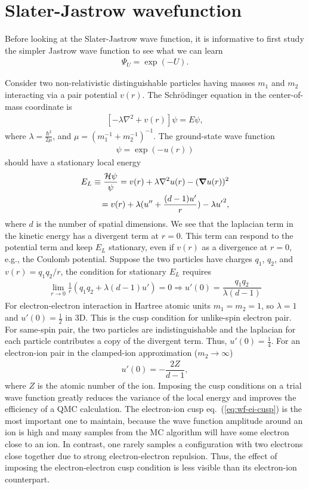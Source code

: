\chapter{Slater-Jastrow wavefunction}

Before looking at the Slater-Jastrow wave function, it is informative to first study the simpler Jastrow wave function to see what we can learn
\begin{align}
\Psi_U = \exp(-U).
\end{align}

Consider two non-relativistic distinguishable particles having masses $m_1$ and $m_2$ interacting via a pair potential $v(r)$. The Schr\"odinger equation in the center-of-mass coordinate is
\begin{align}
\left[-\lambda\nabla^2 + v(r)\right] \psi = E\psi,
\end{align}
where $\lambda=\frac{\hbar^2}{2\mu}$, and $\mu=(m_1^{-1}+m_2^{-1})^{-1}$. The ground-state wave function
\begin{align}
\psi = \exp(-u(r))
\end{align}
should have a stationary local energy
\begin{align} \label{eq:wf-cusp}
E_L \equiv \dfrac{\mathcal{H}\psi}{\psi} = v(r) + \lambda\nabla^2u(r) - (\boldsymbol{\nabla}u(r))^2 \nonumber \\
= v(r) + \lambda (u''+\frac{(d-1)u'}{r}) - \lambda {u'}^2,
\end{align}
where $d$ is the number of spatial dimensions.
We see that the laplacian term in the kinetic energy has a divergent term at $r=0$.
This term can respond to the potential term and keep $E_L$ stationary, even if $v(r)$ as a divergence at $r=0$, e.g., the Coulomb potential. Suppose the two particles have charges $q_1$, $q_2$, and $v(r)=q_1q_2/r$, the condition for stationary $E_L$ requires
\begin{align}
\lim\limits_{r\rightarrow 0}\frac{1}{r} (q_1q_2+ \lambda (d-1) u')=0 \Rightarrow u'(0) = \dfrac{q_1q_2}{\lambda (d-1)}
\end{align}
For electron-electron interaction in Hartree atomic units $m_1=m_2=1$, so $\lambda=1$ and $u'(0)=\frac{1}{2}$ in 3D. This is the cusp condition for unlike-spin electron pair. For same-spin pair, the two particles are indistinguishable and the laplacian for each particle contributes a copy of the divergent term. Thus, $u'(0)=\frac{1}{4}$. For an electron-ion pair in the clamped-ion approximation ($m_2\rightarrow\infty$)
\begin{align} \label{eq:wf-ei-cusp}
u'(0) = -\dfrac{2Z}{d-1},
\end{align}
where $Z$ is the atomic number of the ion. Imposing the cusp conditions on a trial wave function greatly reduces the variance of the local energy and improves the efficiency of a QMC calculation. The electron-ion cusp eq.~(\ref{eq:wf-ei-cusp}) is the most important one to maintain, because the wave function amplitude around an ion is high and many samples from the MC algorithm will have some electron close to an ion. In contrast, one rarely samples a configuration with two electrons close together due to strong electron-electron repulsion. Thus, the effect of imposing the electron-electron cusp condition is less visible than its electron-ion counterpart.

